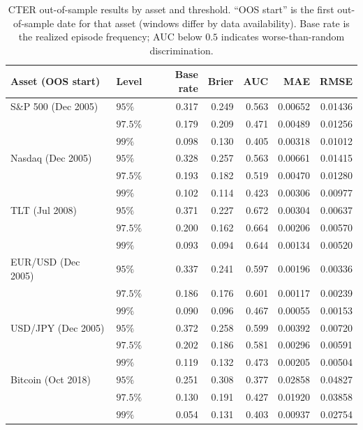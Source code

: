 \documentclass[11pt]{article}
\begin{document}
\begin{table}[t]
\centering
\caption{CTER out-of-sample results by asset and threshold. ``OOS start'' is the first out-of-sample date
for that asset (windows differ by data availability). Base rate is the realized episode frequency; AUC below
$0.5$ indicates worse-than-random discrimination.}
\label{tab:cter}
\begin{tabular}{llrrrrr}
\toprule
Asset (OOS start) & Level & Base rate & Brier & AUC & MAE & RMSE \\
\midrule
S\&P 500 (Dec 2005) & $95\%$   & 0.317 & 0.249 & 0.563 & 0.00652 & 0.01436 \\
                    & $97.5\%$ & 0.179 & 0.209 & 0.471 & 0.00489 & 0.01256 \\
                    & $99\%$   & 0.098 & 0.130 & 0.405 & 0.00318 & 0.01012 \\
Nasdaq (Dec 2005)   & $95\%$   & 0.328 & 0.257 & 0.563 & 0.00661 & 0.01415 \\
                    & $97.5\%$ & 0.193 & 0.182 & 0.519 & 0.00470 & 0.01280 \\
                    & $99\%$   & 0.102 & 0.114 & 0.423 & 0.00306 & 0.00977 \\
TLT (Jul 2008)      & $95\%$   & 0.371 & 0.227 & 0.672 & 0.00304 & 0.00637 \\
                    & $97.5\%$ & 0.200 & 0.162 & 0.664 & 0.00206 & 0.00570 \\
                    & $99\%$   & 0.093 & 0.094 & 0.644 & 0.00134 & 0.00520 \\
EUR/USD (Dec 2005)  & $95\%$   & 0.337 & 0.241 & 0.597 & 0.00196 & 0.00336 \\
                    & $97.5\%$ & 0.186 & 0.176 & 0.601 & 0.00117 & 0.00239 \\
                    & $99\%$   & 0.090 & 0.096 & 0.467 & 0.00055 & 0.00153 \\
USD/JPY (Dec 2005)  & $95\%$   & 0.372 & 0.258 & 0.599 & 0.00392 & 0.00720 \\
                    & $97.5\%$ & 0.202 & 0.186 & 0.581 & 0.00296 & 0.00591 \\
                    & $99\%$   & 0.119 & 0.132 & 0.473 & 0.00205 & 0.00504 \\
Bitcoin (Oct 2018)  & $95\%$   & 0.251 & 0.308 & 0.377 & 0.02858 & 0.04827 \\
                    & $97.5\%$ & 0.130 & 0.191 & 0.427 & 0.01920 & 0.03858 \\
                    & $99\%$   & 0.054 & 0.131 & 0.403 & 0.00937 & 0.02754 \\
\bottomrule
\end{tabular}
\end{table}
\end{document}
